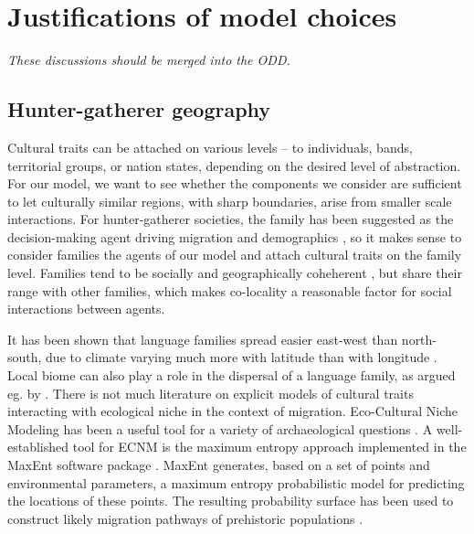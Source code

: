 \documentclass[a4paper,12pt]{scrartcl}
\begin{document}

\section{Justifications of model choices}
\label{s:earlier}

\emph{These discussions should be merged into the ODD.}
\subsection{Hunter-gatherer geography}
\label{s:geography}
Cultural traits can be attached on various levels – to individuals, bands,
territorial groups, or nation states, depending on the desired level of
abstraction. For our model, we want to see whether the components we consider
are sufficient to let culturally similar regions, with sharp boundaries, arise
from smaller scale interactions. For hunter-gatherer societies, the family has
been suggested as the decision-making agent driving migration and demographics
\parencite{}, so it makes sense to consider families the agents of our model and
attach cultural traits on the family level. Families tend to be socially and
geographically coheherent \textcite{}, but share their range with other
families, which makes co-locality a reasonable factor for social interactions
between agents.

It has been shown that language families spread easier east-west than
north-south, due to climate varying much more with latitude than with longitude
\parencite{}. Local biome can also play a role in the dispersal of a language
family, as argued eg. by \textcite{grollemund2015bantu,ehret2015bantu}. There is
not much literature on explicit models of cultural traits interacting with
ecological niche in the context of migration. Eco-Cultural Niche Modeling
\parencite[ECNM]{banks2006ecocultural} has been a useful tool for a variety of
archaeological questions
\cite{banks2008human,banks2013ecological,dalpoimguedes2014modeling,kondo2018ecological,walker2019persistence}.
A well-established tool for ECNM is the maximum entropy approach implemented in
the MaxEnt software package
\cite{phillips2006maximum,phillips2008modeling,maxenttutorial}. MaxEnt
generates, based on a set of points and environmental parameters, a maximum
entropy probabilistic model for predicting the locations of these points. The
resulting probability surface has been used to construct likely migration
pathways of prehistoric populations \cite{kondo2018ecological}.
\end{document}

